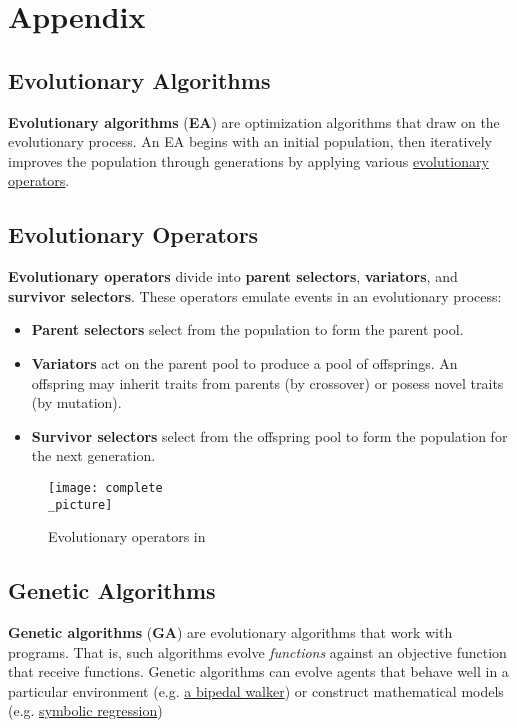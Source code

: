 \documentclass{article}
\begin{document}
\section{Appendix}

\subsection{Evolutionary Algorithms}
\label{sec:evalg}
\textbf{Evolutionary algorithms} (\textbf{EA}) are optimization algorithms that draw on the evolutionary process. An EA begins with an initial population, then iteratively improves the population through generations by applying various \hyperref[sec:evop]{evolutionary operators}.

\subsection{Evolutionary Operators}
\label{sec:evop}
\textbf{Evolutionary operators} divide into \textbf{parent selectors}, \textbf{variators}, and \textbf{survivor selectors}. These operators emulate events in an evolutionary process:

\begin{itemize}
    \item \textbf{Parent selectors} select from the population to form the parent pool.
    \item \textbf{Variators} act on the parent pool to produce a pool of offsprings. An offspring may inherit traits from parents (by crossover) or posess novel traits (by mutation).
    \item \textbf{Survivor selectors} select from the offspring pool to form the population for the next generation.
\end{itemize}

\begin{figure}[h]
    \caption{Evolutionary operators in}
    \texttt{[image: complete\\\_picture]}    
    \centering
\end{figure}

\subsection{Genetic Algorithms}
\label{sec:genalg}
\textbf{Genetic algorithms} (\textbf{GA}) are evolutionary algorithms that work with programs. That is, such algorithms evolve \textit{functions} against an objective function that receive functions. Genetic algorithms can evolve agents that behave well in a particular environment (e.g. \href{https://www.mdpi.com/2227-7390/11/13/2931}{a bipedal walker}) or construct mathematical models (e.g. \href{https://link.springer.com/article/10.1007/s11831-023-09922-z}{symbolic regression})
\end{document}
